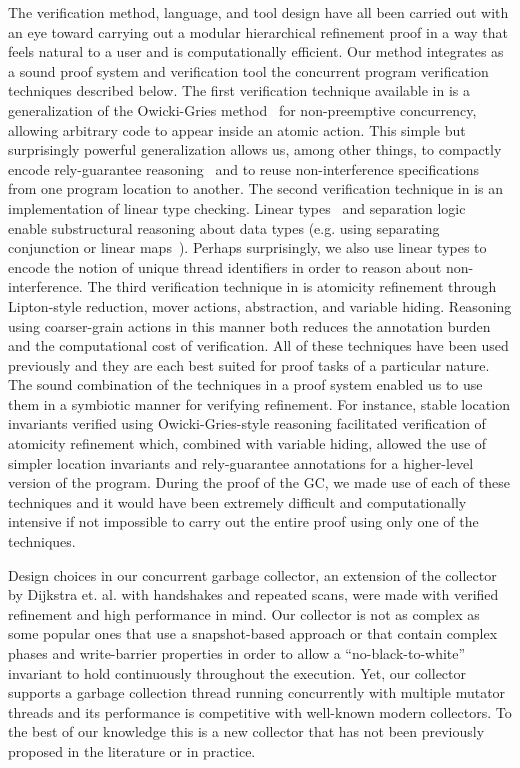 The verification method, language, and tool design have all been carried out with an eye toward carrying out a modular hierarchical refinement proof in a way that feels natural to a user and is computationally efficient. Our method integrates as a sound proof system and verification tool the concurrent program verification techniques described below. 
The first verification technique available in \civl is a generalization of the Owicki-Gries method~\cite{OwickiG76} for non-preemptive concurrency, 
allowing arbitrary code to appear inside an atomic action. 
This simple but surprisingly powerful generalization allows us, among other things, to compactly encode rely-guarantee reasoning~\cite{Jones83}
and to reuse non-interference specifications from one program location to another.
The second verification technique in \civl is an implementation of linear type checking.
Linear types~\cite{Wadler90lineartypes} and separation logic~\cite{Reynolds02} enable substructural reasoning about data types
(e.g. using separating conjunction or linear maps~\cite{LahiriQW11}).
Perhaps surprisingly, we also use linear types to encode the notion of unique thread identifiers in order to reason about non-interference.
The third verification technique in \civl is atomicity refinement through Lipton-style reduction, mover actions, abstraction, and variable hiding.
Reasoning using coarser-grain actions in this manner both reduces the annotation burden and the computational cost of verification. 
All of these techniques have been used previously and they are each best suited for proof tasks of a particular nature. 
The sound combination of the techniques in a proof system enabled us to use them in a symbiotic manner for verifying refinement. 
For instance, stable location invariants verified using Owicki-Gries-style reasoning facilitated verification of atomicity refinement which, combined with variable hiding, allowed the use of simpler location invariants and rely-guarantee annotations for a higher-level version of the program. 
During the proof of the GC, we made use of each of these techniques and it would have been extremely difficult and computationally intensive if not impossible to carry out the entire proof using only one of the techniques. 

Design choices in our concurrent garbage collector, an extension of the collector by Dijkstra et. al. \cite{dijk78}  with handshakes \cite{doli93,doli94} and repeated scans, were made with verified refinement and high performance in mind. 
Our collector is not as complex as some popular ones that use a snapshot-based approach \cite{doli93,doli94,doma00,azat03} or that contain complex phases and write-barrier properties \cite{boeh91,prin00a,bara05} in order to allow a ``no-black-to-white'' invariant to hold continuously throughout the execution. 
Yet, our collector supports a garbage collection thread running concurrently with multiple mutator threads and its performance is competitive with well-known modern collectors. 
To the best of our knowledge this is a new collector that has not been previously proposed in the literature or in practice. 


